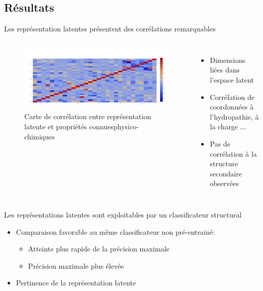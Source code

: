 \documentclass{beamer}
\begin{document}
\subsection{Résultats}

\begin{frame}{Les représentation latentes présentent des corrélations remarquables}

  \begin{columns}
    \begin{figure}
      \centering
      \includegraphics[scale=0.1650]{../Figures/SingleOneRecHeat}
      \caption{Carte de corrélation entre représentation latente et propriétés connuesphysico-chimiques}
    \end{figure}

    \begin{itemize}
    \item Dimensions liées dans l'espace latent\pause
    \item Corrélation de coordonnées à l'hydropathie, à la charge ...\pause
    \item Pas de corrélation à la structure secondaire observées\pause
    \end{itemize}
  \end{columns}

\end{frame}

\begin{frame}{Les représentations latentes sont exploitables par un
    classificateur structural}

    \begin{itemize}
     
    \item Comparaison favorable au même classificateur non pré-entrainé:
      \begin{itemize}
      \item Atteinte plus rapide de la précision maximale\pause
      \item Précision maximale plus élevée\pause
      \end{itemize}
    \item Pertinence de la représentation latente\pause
    \end{itemize}

 \end{frame}
\end{document}
